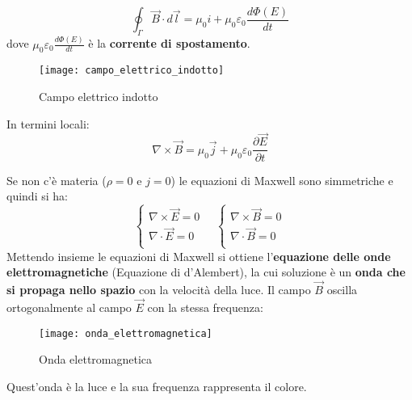 \documentclass[a4paper]{article}
\begin{document}
\begin{definition}
  \[
    \oint_{\Gamma} \vec{B} \cdot d\vec{l} = \mu_0 i + \mu_0 \varepsilon_0 \frac{d \Phi (E)}{dt}
  \] 
  dove \( \mu_0 \varepsilon_0 \frac{d \Phi(E)}{dt} \) è la \textbf{corrente di spostamento}.
  \begin{figure}[H]
    \centering
    \texttt{[image: campo\_elettrico\_indotto]}
    \caption{Campo elettrico indotto}
  \end{figure}
  \noindent
  In termini locali:
  \[
    \nabla \times \vec{B} = \mu_0 \vec{j} + \mu_0 \varepsilon_0 \frac{\partial \vec{E}}{\partial t}
  \] 
\end{definition}
\noindent
Se non c'è materia (\( \rho = 0 \) e \( j = 0 \)) le equazioni di Maxwell sono simmetriche
e quindi si ha:
\[
  \begin{cases}
    \nabla \times \vec{E} = 0\\
    \nabla \cdot \vec{E} = 0\\
  \end{cases}
  \quad
  \begin{cases}
    \nabla \times \vec{B} = 0\\
    \nabla \cdot \vec{B} = 0\\
  \end{cases}
\] 
Mettendo insieme le equazioni di Maxwell si ottiene 
l'\textbf{equazione delle onde elettromagnetiche} (Equazione di d'Alembert), la cui
soluzione è un \textbf{onda che si propaga nello spazio} con la velocità della luce.
Il campo \( \vec{B} \) oscilla ortogonalmente al campo \( \vec{E} \) con la stessa
frequenza:
\begin{figure}[H]
  \centering
  \texttt{[image: onda\_elettromagnetica]}
  \caption{Onda elettromagnetica}
\end{figure}
\noindent
Quest'onda è la luce e la sua frequenza rappresenta il colore.
\end{document}

